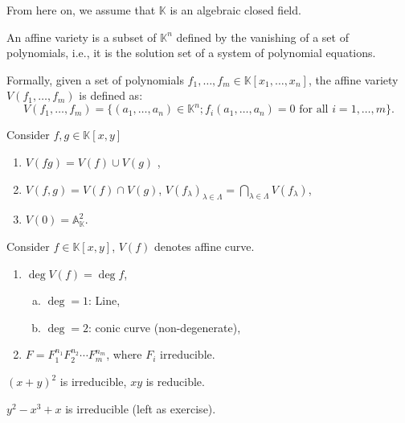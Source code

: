 \documentclass[10pt]{article}
\begin{document}
From here on, we assume that $ \mathbb{K}$ is an algebraic closed field.
\begin{definition}
  An affine variety is a subset of $ \mathbb{K}^{n}$ defined by the vanishing of a set of polynomials, i.e., it is the solution set of a system of polynomial equations.

  Formally, given a set of polynomials $ f_1, \ldots, f_m \in \mathbb{K}[x_1,\ldots,x_n]$, the affine variety $ V(f_1, \ldots, f_m)$ is defined as:
  \begin{equation*}
    V(f_1, \ldots, f_m) = \{ (a_1, \ldots, a_n) \in \mathbb{K}^{n} ; f_i(a_1, \ldots, a_n) = 0 \text{ for all } i = 1, \ldots, m \}.
  \end{equation*}
\end{definition}

\begin{proposition}
  Consider $ f, g \in \mathbb{K}[x,y]$
  \begin{enumerate}[(1)]
    \item $V(fg) = V(f) \cup V(g)$ ,
    \item $ V(f, g) = V(f) \cap V(g)$, $ V(f_{\lambda})_{\lambda \in \Lambda} = \bigcap_{\lambda \in \Lambda} V(f_{\lambda})$,
    \item $ V(0) = \mathbb{A}_{\mathbb{K}}^{2}$.
  \end{enumerate}
\end{proposition}

\begin{definition}
  Consider $ f \in \mathbb{K}[x,y]$, $ V(f)$ denotes affine curve.
  \begin{enumerate}[(1)]
    \item $ \deg V(f) = \deg f$,
      \begin{enumerate}[(a)]
        \item $\deg = 1$: Line,
        \item $\deg = 2$: conic curve (non-degenerate),
      \end{enumerate}
    \item $ F = F_{1}^{n_1} F_2^{n_2} \cdots F_{m}^{n_{m}}$, where $ F_{i}$ irreducible.
  \end{enumerate}
\end{definition}

\begin{example}
  $( x + y )^{2}$ is irreducible, $ xy$ is reducible.
\end{example}
\begin{example}
  $ y^{2} - x^{3} + x$ is irreducible (left as exercise).
\end{example}
\end{document}
